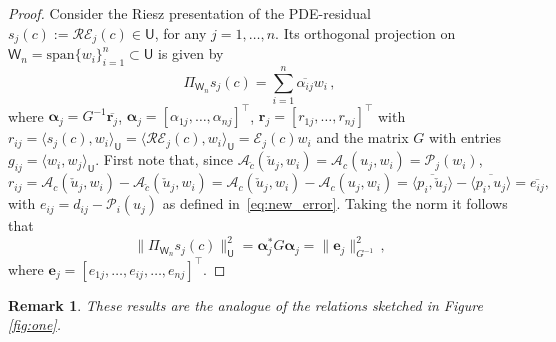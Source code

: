 \documentclass[12pt]{amsart}
\newcommand{\U}{\mathsf{U}}
\newtheorem{rem}{Remark}
\begin{document}
\begin{proof}
Consider the Riesz presentation of the PDE-residual $s_j(c) := \mathcal{R}\mathcal{E}_j(c) \in \U $, for any $j= 1,\ldots, n$. Its orthogonal projection on $\mathsf{W}_n = \text{span}\{w_i\}_{i=1}^n \subset \U$ is given by
\[
\Pi_{\mathsf{W}_n} s_j(c) = \sum_{i=1}^n \overline{\alpha_{ij}} w_i\,,
\]
where $\boldsymbol{\alpha}_{j} = G^{-1}\overline{\mathbf{r}_j}$, $\boldsymbol{\alpha}_{j} = [{\alpha}_{1j},\ldots, {\alpha}_{nj}]^\top$, $\mathbf{r}_{j} = [{r}_{1j},\ldots, {r}_{nj}]^\top$  with $r_{ij} = \langle s_j(c),w_i\rangle_{\mathsf{U}} =  \langle \mathcal{R}\mathcal{E}_j(c) , w_i\rangle_{\U} = \mathcal{E}_j(c) w_i$ and the matrix $G$ with entries $g_{ij}=\langle w_i, w_j\rangle_\mathsf{U}$. First note that, since $\mathcal{A}_{\check{c}}(\check{u}_j,w_i)  = \mathcal{A}_{c}({u}_j,w_i)  = \mathcal{P}_j(w_i)$,
\[
r_{ij} = \mathcal{A}_c(\check{u}_j,w_i) -  \mathcal{A}_{\check{c}}(\check{u}_j,w_i) = \mathcal{A}_c(\check{u}_j,w_i) -  \mathcal{A}_{c}({u}_j,w_i) = \overline{\langle p_i,\check{u}_j\rangle} - \overline{\langle p_i,u_j\rangle} = \overline{e_{ij}},
\]
with $e_{ij} =d_{ij} -  \mathcal{P}_i(u_j) $ as defined in~\eqref{eq:new_error}. Taking the norm it follows that 
\[
\|\Pi_{\mathsf{W}_n} s_j(c)\|_{\mathsf{U}}^2 = \boldsymbol{\alpha}_j^*G\boldsymbol{\alpha}_j = \|\mathbf{e}_j\|^2_{G^{-1}}\,,
\]
where $\mathbf{e}_j = [e_{1j}, \ldots, e_{ij},\ldots, e_{nj}]^\top$.
\end{proof}
\begin{rem}
These results are the analogue of the relations sketched in Figure \ref{fig:one}.
\end{rem}
\end{document}
